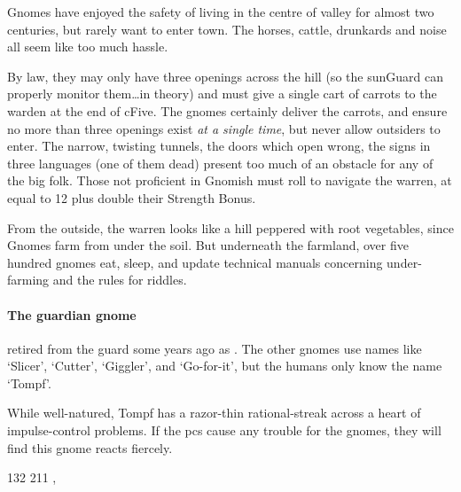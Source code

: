\begin{multicols}{2}
\noindent
Gnomes have enjoyed the safety of living in the centre of \gls{valley} for almost two centuries, but rarely want to enter \gls{town}.
The horses, cattle, drunkards and noise all seem like too much hassle.

By law, they may only have three openings across the hill (so the \gls{sunGuard} can properly monitor them\ldots in theory) and must give a single cart of carrots to the \gls{warden} at the end of \gls{cFive}.
The gnomes certainly deliver the carrots, and ensure no more than three openings exist \emph{at a single time}, but never allow outsiders to enter.
The narrow, twisting tunnels, the doors which open wrong, the signs in three languages (one of them dead) present too much of an obstacle for any of the big folk.
Those not proficient in Gnomish must roll  to navigate the warren, at  equal to 12 plus double their Strength Bonus.

From the outside, the warren looks like a hill peppered with root vegetables, since Gnomes farm from under the soil.%
But underneath the farmland, over five hundred gnomes eat, sleep, and update technical manuals concerning under-farming and the rules for riddles.

\paragraph{The guardian gnome}
retired from the \gls{guard} some years ago as .
The other gnomes use names like `Slicer', `Cutter', `Giggler', and `Go-for-it', but the humans only know the name `Tompf'.

While well-natured, Tompf has a razor-thin rational-streak across a heart of impulse-control problems.
If the \glspl{pc} cause any trouble for the gnomes, they will find this gnome reacts fiercely.

%
  {{1}{3}{2}}%
  {{2}{1}{1}}%
  {%
    \rapier
    \partialleather
  }%
  {\weaponmaster, \guardian}%
  {\rations}%
  {}%

\end{multicols}


